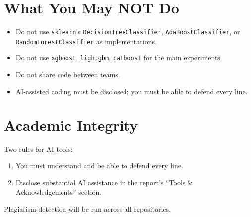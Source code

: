 \documentclass[11pt,a4paper]{article}
\begin{document}
\section{What You May NOT Do}
\begin{itemize}[topsep=2pt,itemsep=1pt]
  \item Do not use \texttt{sklearn}'s \texttt{DecisionTreeClassifier}, \texttt{AdaBoostClassifier}, or \texttt{RandomForestClassifier} as implementations.
  \item Do not use \texttt{xgboost}, \texttt{lightgbm}, \texttt{catboost} for the main experiments.
  \item Do not share code between teams.
  \item AI-assisted coding must be disclosed; you must be able to defend every line.
\end{itemize}
\section{Academic Integrity}
Two rules for AI tools:
\begin{enumerate}[topsep=2pt,itemsep=2pt,leftmargin=2.2em]
  \item You must understand and be able to defend every line.
  \item Disclose substantial AI assistance in the report's ``Tools \& Acknowledgements'' section.
\end{enumerate}
Plagiarism detection will be run across all repositories.
\end{document}

